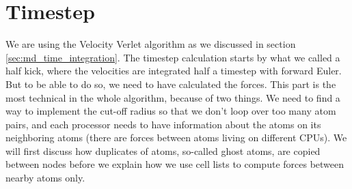 \section{Timestep}
We are using the Velocity Verlet algorithm as we discussed in section \ref{sec:md_time_integration}. The timestep calculation starts by what we called a half kick, where the velocities are integrated half a timestep with forward Euler. But to be able to do so, we need to have calculated the forces. This part is the most technical in the whole algorithm, because of two things. We need to find a way to implement the cut-off radius so that we don't loop over too many atom pairs, and each processor needs to have information about the atoms on its neighboring atoms (there are forces between atoms living on different CPUs). We will first discuss how duplicates of atoms, so-called ghost atoms, are copied between nodes before we explain how we use cell lists to compute forces between nearby atoms only. 
